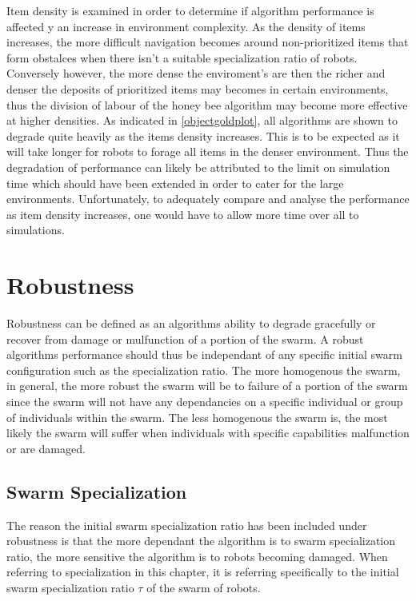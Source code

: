 Item density is examined in order to determine if algorithm performance is affected y an increase in environment complexity. As the density of items increases, the more difficult navigation becomes around non-prioritized items that form obstalces when there isn't a suitable specialization ratio of robots. Conversely however, the more dense the enviroment's are then the richer and denser the deposits of prioritized items may becomes in certain environments, thus the division of labour of the honey bee algorithm may become more effective at higher densities. As indicated in \ref{objectgoldplot}, all algorithms are shown to degrade quite heavily as the items density increases. This is to be expected as it will take longer for robots to forage all items in the denser environment. Thus the degradation of performance can likely be attributed to the limit on simulation time which should have been extended in order to cater for the large environments. Unfortunately, to adequately compare and analyse the performance as item density increases, one would have to allow more time over all to simulations.

\section{Robustness}
\label{results:robustness}

Robustness can be defined as an algorithms ability to degrade gracefully or recover from damage or mulfunction of a portion of the swarm. A robust algorithms performance should thus be independant of any specific initial swarm configuration such as the specialization ratio. The more homogenous the swarm, in general, the more robust the swarm will be to failure of a portion of the swarm since the swarm will not have any dependancies on a specific individual or group of individuals within the swarm. The less homogenous the swarm is, the most likely the swarm will suffer when individuals with specific capabilities malfunction or are damaged.

\subsection{Swarm Specialization}
\label{results:specialization}

The reason the initial swarm specialization ratio has been included under robustness is that the more dependant the algorithm is to swarm specialization ratio, the more sensitive  the algorithm is to robots becoming damaged. When referring to specialization in this chapter, it is referring specifically to the initial swarm specialization ratio $\tau$ of the swarm of robots. 

